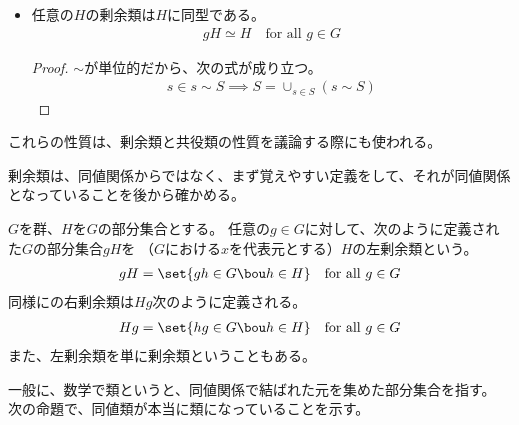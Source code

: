 \begin{itemize}
\begin{proof}
		\end{proof}
		\item 任意の$H$の剰余類は$H$に同型である。
		\begin{equation*}\begin{split} %
			gH \simeq H \quad\text{for all }g\in G
		\end{split}\end{equation*} %
		\begin{proof} $\sim$が単位的だから、次の式が成り立つ。
		\begin{equation*}\begin{split}
			s\in s\sim S \implies S = \cup_{s\in S}(s\sim S)
		\end{split}\end{equation*}
		\end{proof}
	\end{itemize} %
	これらの性質は、剰余類と共役類の性質を議論する際にも使われる。

	剰余類は、同値関係からではなく、まず覚えやすい定義をして、それが同値関係
	となっていることを後から確かめる。

	\begin{definition}\label{def:剰余類} %
		$G$を群、$H$を$G$の部分集合とする。
		任意の$g\in G$に対して、次のように定義された$G$の部分集合$gH$を
		（$G$における$x$を代表元とする）$H$の左剰余類という。
		\begin{equation*}\begin{split} %
			gH = \set{gh\in G\bou h\in H} \quad\text{for all }g\in G
		\end{split}\end{equation*} %
		同様にの右剰余類は$Hg$次のように定義される。
		\begin{equation*}\begin{split} %
			Hg = \set{hg\in G\bou h\in H} \quad\text{for all }g\in G
		\end{split}\end{equation*} %
		また、左剰余類を単に剰余類ということもある。
	\end{definition} %

	一般に、数学で類というと、同値関係で結ばれた元を集めた部分集合を指す。
	次の命題で、同値類が本当に類になっていることを示す。

